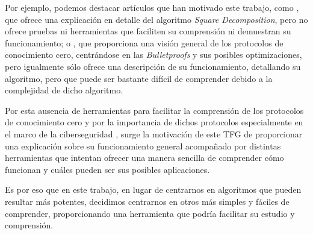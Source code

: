 Por ejemplo, podemos destacar artículos que han motivado este trabajo, como \cite{Boudot}, que ofrece una explicación en detalle del algoritmo \emph{Square Decomposition}, pero no ofrece pruebas ni herramientas que faciliten su comprensión ni demuestran su funcionamiento; o \cite{Survey}, que proporciona una visión general de los protocolos de conocimiento cero, centrándose en las \emph{Bulletproofs} y sus posibles optimizaciones, pero igualmente sólo ofrece una descripción de su funcionamiento, detallando su algoritmo, pero que puede ser bastante difícil de comprender debido a la complejidad de dicho algoritmo.

Por esta ausencia de herramientas para facilitar la comprensión de los protocolos de conocimiento cero y por la importancia de dichos protocolos especialmente en el marco de la ciberseguridad , surge la motivación de este TFG de proporcionar una explicación sobre su funcionamiento general acompañado por distintas herramientas que intentan ofrecer una manera sencilla de comprender cómo funcionan y cuáles pueden ser sus posibles aplicaciones.

Es por eso que en este trabajo, en lugar de centrarnos en algoritmos que pueden resultar más potentes, decidimos centrarnos en otros más simples y fáciles de comprender, proporcionando una herramienta que podría facilitar su estudio y comprensión.
